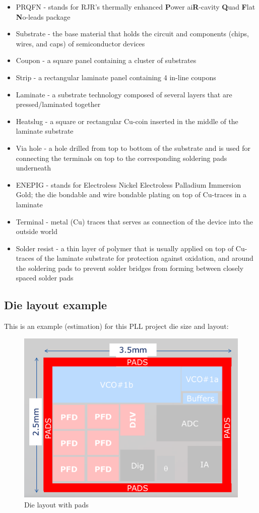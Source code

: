 \begin{itemize}
	\item PRQFN - stands for RJR's thermally enhanced \textbf{P}ower ai\textbf{R}-cavity \textbf{Q}uad \textbf{F}lat \textbf{N}o-leads package
	\item Substrate - the base material that holds the circuit and components (chips, wires, and caps) of semiconductor devices
	\item Coupon - a square panel containing a cluster of substrates
	\item Strip - a rectangular laminate panel containing 4 in-line coupons
	\item Laminate - a substrate technology composed of several layers that are pressed/laminated together
	\item Heatslug - a square or rectangular Cu-coin inserted in the middle of the laminate substrate
	\item Via hole - a hole drilled from top to bottom of the substrate and is used for connecting the terminals on top to the corresponding soldering pads underneath
	\item ENEPIG - stands for Electroless Nickel Electroless Palladium Immersion Gold; the die bondable and wire bondable plating on top of Cu-traces in a laminate
	\item Terminal - metal (Cu) traces that serves as connection of the device into the outside world
	\item Solder resist - a thin layer of polymer that is usually applied on top of Cu-traces of the laminate substrate for protection against oxidation, and around the soldering pads to prevent solder bridges from forming between closely spaced solder pads
\end{itemize}

\subsection{Die layout example}

This is an example (estimation) for this PLL project die size and layout:

\begin{figure}[ht!]
	\centering %
	\includegraphics[width=0.5\linewidth]{Figures/die-size-with-pads.png}
	\caption{Die layout with pads }
	\label{fig:die-size-with-pads}
\end{figure}

